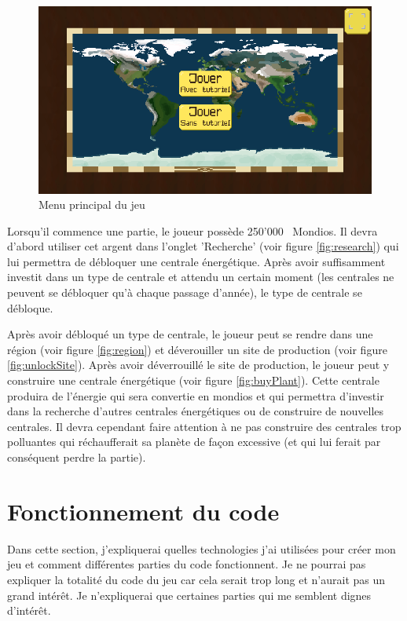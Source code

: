 \documentclass{article}
\newcommand{\initMoney}{250'000}
\begin{document}
        \begin{figure}[H]
                \includegraphics[width=\linewidth]{../images/mainMenu}
                \caption{Menu principal du jeu}
                \label{fig:mainMenu}
        \end{figure}
        
        Lorsqu'il commence une partie, le joueur possède \initMoney ~ Mondios. Il devra d'abord utiliser cet argent dans l'onglet 'Recherche' (voir figure \ref{fig:research}) qui lui permettra de débloquer une centrale énergétique. Après avoir suffisamment investit dans un type de centrale et attendu un certain moment (les centrales ne peuvent se débloquer qu'à chaque passage d'année), le type de centrale se débloque.
        
        
        Après avoir débloqué un type de centrale, le joueur peut se rendre dans une région (voir figure \ref{fig:region}) et déverouiller un site de production (voir figure \ref{fig:unlockSite}). Après avoir déverrouillé le site de production, le joueur peut y construire une centrale énergétique (voir figure \ref{fig:buyPlant}). Cette centrale produira de l'énergie qui sera convertie en mondios et qui permettra d'investir dans la recherche d'autres centrales énergétiques ou de construire de nouvelles centrales. Il devra cependant faire attention à ne pas construire des centrales trop polluantes qui réchaufferait sa planète de façon excessive (et qui lui ferait par conséquent perdre la partie).
        

        \section{Fonctionnement du code}
        Dans cette section, j'expliquerai quelles technologies j'ai utilisées pour créer mon jeu et comment différentes parties du code fonctionnent. Je ne pourrai pas expliquer la totalité du code du jeu car cela serait trop long et n'aurait pas un grand intérêt. Je n'expliquerai que certaines parties qui me semblent dignes d'intérêt.
        
\end{document}
